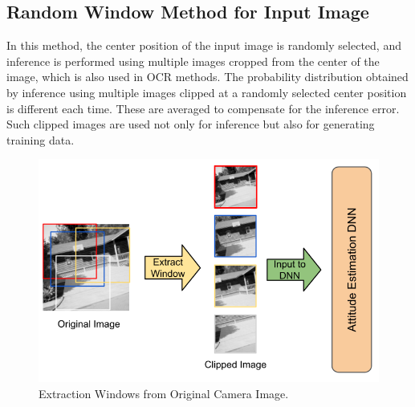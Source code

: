 \subsection{Random Window Method for Input Image}\label{sec:random_window}
In this method, the center position of the input image is randomly selected, and inference is performed using multiple images cropped from the center of the image, which is also used in OCR methods\cite{OCR_paper}. The probability distribution obtained by inference using multiple images clipped at a randomly selected center position is different each time. These are averaged to compensate for the inference error. Such clipped images are used not only for inference but also for generating training data.


\begin{figure}[thpb]
\centering
\includegraphics[scale=0.4]{./figure/2_method/RandomWindow_2.png}
\caption{Extraction Windows from Original Camera Image.}
\label{fig:extract_windows}
\end{figure}